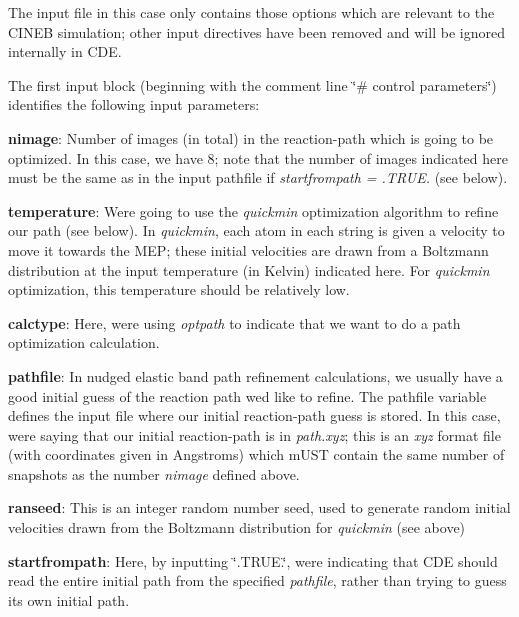 The input file in this case only contains those options which are relevant to the C\+I\+N\+EB simulation; other input directives have been removed and will be ignored internally in C\+DE.

The first input block (beginning with the comment line \char`\"{}\# control parameters\char`\"{}) identifies the following input parameters\+:
\begin{DoxyItemize}
\item {\bfseries nimage}\+: Number of images (in total) in the reaction-\/path which is going to be optimized. In this case, we have 8; note that the number of images indicated here must be the same as in the input pathfile if {\itshape startfrompath = .T\+R\+UE.} (see below).
\item {\bfseries temperature}\+: We\textquotesingle{}re going to use the {\itshape quickmin} optimization algorithm to refine our path (see below). In {\itshape quickmin}, each atom in each string is given a velocity to move it towards the M\+EP; these initial velocities are drawn from a Boltzmann distribution at the input temperature (in Kelvin) indicated here. For {\itshape quickmin} optimization, this temperature should be relatively low.
\item {\bfseries calctype}\+: Here, we\textquotesingle{}re using {\itshape optpath} to indicate that we want to do a path optimization calculation.
\item {\bfseries pathfile}\+: In nudged elastic band path refinement calculations, we usually have a good initial guess of the reaction path we\textquotesingle{}d like to refine. The pathfile variable defines the input file where our initial reaction-\/path guess is stored. In this case, we\textquotesingle{}re saying that our initial reaction-\/path is in {\itshape path.\+xyz}; this is an {\itshape xyz} format file (with coordinates given in Angstroms) which m\+U\+ST contain the same number of snapshots as the number {\itshape nimage} defined above.
\item {\bfseries ranseed}\+: This is an integer random number seed, used to generate random initial velocities drawn from the Boltzmann distribution for {\itshape quickmin} (see above)
\item {\bfseries startfrompath}\+: Here, by inputting \char`\"{}.\+T\+R\+U\+E.\char`\"{}, we\textquotesingle{}re indicating that C\+DE should read the entire initial path from the specified {\itshape pathfile}, rather than trying to guess its own initial path.
\end{DoxyItemize}

